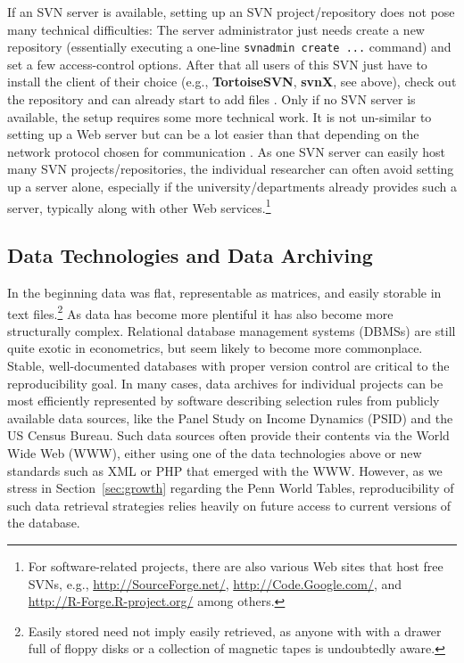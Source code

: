 \documentclass[10pt,a4paper,twoside]{article}
\let\code=\texttt
\let\pkg=\textbf
\let\proglang=\textsf
\begin{document}
If an SVN server is available, setting up an SVN project/repository does not pose many
technical difficulties: The server administrator just needs create a new repository
(essentially executing a one-line \code{svnadmin create ...} command) and set
a few access-control options. After that all users of this SVN just have
to install the client of their choice (e.g., \pkg{TortoiseSVN}, \pkg{svnX}, see above), check
out the repository and can already start to add files
\citep[see][Chapter~2]{repro:Pilato+Collins-Sussman+Fitzpatrick:2004}. 
Only if no SVN server is available, the setup requires some more technical work.
It is not un-similar to setting up a Web server but can be a lot easier than that
depending on the network protocol chosen for communication
\citep[see][Chapter~6]{repro:Pilato+Collins-Sussman+Fitzpatrick:2004}. As one
SVN server can easily host many SVN projects/repositories, the individual researcher
can often avoid setting up a server alone, especially if the university/departments
already provides such a server, typically along with other Web services.\footnote{For software-related
projects, there are also various Web sites that host free SVNs, e.g.,
\url{http://SourceForge.net/}, \url{http://Code.Google.com/},
and \url{http://R-Forge.R-project.org/} among others.}

\subsection{Data Technologies and Data Archiving} \label{sec:data}

In the beginning data was flat, representable as matrices, and easily storable in
text files.\footnote{Easily stored need not imply easily retrieved, as anyone with 
with a drawer full of floppy disks or a collection of magnetic tapes 
is undoubtedly aware.} As data has become more plentiful it has also become
more structurally complex.
Relational database management systems (DBMSs) are still
quite exotic in econometrics, but seem likely to become more commonplace.
Stable, well-documented databases with proper version control are critical to
the reproducibility goal. 
In many cases, data archives for individual projects can be most efficiently
represented by software describing selection rules from publicly available
data sources, like the Panel Study on Income Dynamics (PSID) and the US
Census Bureau. Such data sources often provide their contents via the World
Wide Web (WWW), either using one of the data technologies above or new standards
such as \proglang{XML} or \proglang{PHP} that emerged with the WWW.
However, as we stress in Section~\ref{sec:growth} regarding the Penn World Tables,
reproducibility of such data retrieval strategies relies heavily on future access to
current versions of the database.
\end{document}
